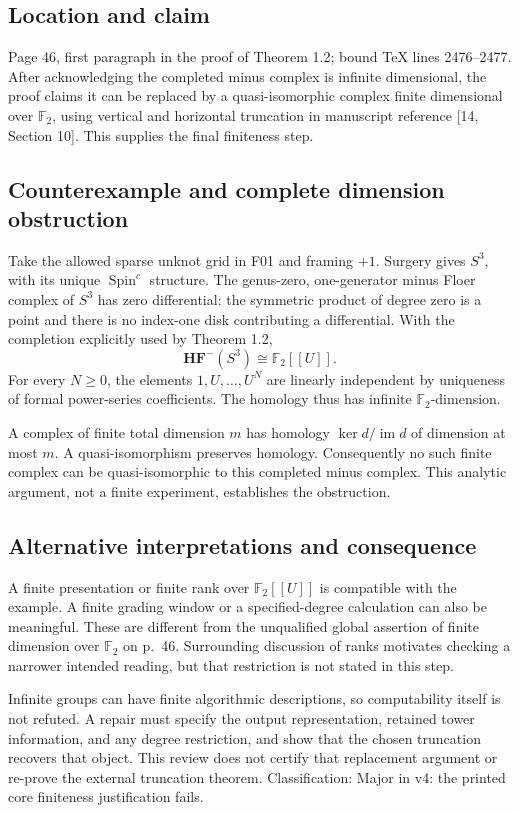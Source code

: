 \documentclass[10pt]{article}
\begin{document}
\subsection*{Location and claim}
Page 46, first paragraph in the proof of Theorem 1.2; bound TeX lines 2476–2477. After acknowledging the completed minus complex is infinite dimensional, the proof claims it can be replaced by a quasi-isomorphic complex finite dimensional over \(\mathbb F_2\), using vertical and horizontal truncation in manuscript reference [14, Section 10]. This supplies the final finiteness step.\par
\subsection*{Counterexample and complete dimension obstruction}
Take the allowed sparse unknot grid in F01 and framing \(+1\). Surgery gives \(S^3\), with its unique \(\operatorname{Spin}^c\) structure. The genus-zero, one-generator minus Floer complex of \(S^3\) has zero differential: the symmetric product of degree zero is a point and there is no index-one disk contributing a differential. With the completion explicitly used by Theorem 1.2, \[\mathbf{HF}^{-}(S^3)\cong\mathbb F_2[[U]].\] For every \(N\geq0\), the elements \(1,U,\ldots,U^N\) are linearly independent by uniqueness of formal power-series coefficients. The homology thus has infinite \(\mathbb F_2\)-dimension.\par
A complex of finite total dimension \(m\) has homology \(\ker d/\operatorname{im}d\) of dimension at most \(m\). A quasi-isomorphism preserves homology. Consequently no such finite complex can be quasi-isomorphic to this completed minus complex. This analytic argument, not a finite experiment, establishes the obstruction.\par
\subsection*{Alternative interpretations and consequence}
A finite presentation or finite rank over \(\mathbb F_2[[U]]\) is compatible with the example. A finite grading window or a specified-degree calculation can also be meaningful. These are different from the unqualified global assertion of finite dimension over \(\mathbb F_2\) on p. 46. Surrounding discussion of ranks motivates checking a narrower intended reading, but that restriction is not stated in this step.\par
Infinite groups can have finite algorithmic descriptions, so computability itself is not refuted. A repair must specify the output representation, retained tower information, and any degree restriction, and show that the chosen truncation recovers that object. This review does not certify that replacement argument or re-prove the external truncation theorem. Classification: Major in v4: the printed core finiteness justification fails.\par
\end{document}
